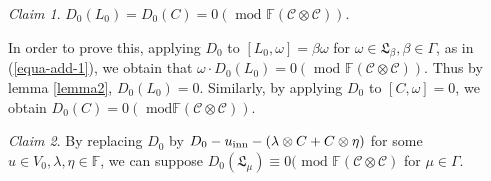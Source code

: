 \documentclass{amsart}
\theoremstyle{definition}
\theoremstyle{remark}
\numberwithin{equation}{subsection}
\numberwithin{equation}{section}
\newtheorem{clai}{Claim}
\begin{document}
\begin{clai}
\label{clai3} \rm $D_0(L_0)=D_0(C)=0(\mbox{ mod }\mathbb{F}(\mathcal
{C}\otimes \mathcal {C}))$.
\end{clai}

In order to prove this, applying $D_0$ to $[L_0,\omega]={\beta} \omega$
for $\omega \in {\mathfrak{L}}_\beta, {\beta} \in \Gamma$, as in
(\ref{equa-add-1}), we obtain that \mbox{$\omega\cdot
D_0(L_0)=0(\mbox{ mod }\mathbb{F}(\mathcal {C}\otimes \mathcal
{C}))$.} Thus by lemma \ref{lemma2}, $D_0(L_0)=0$. Similarly, by
applying $D_0$ to $[C,\omega]=0$, we obtain $D_0(C)=0 (\mbox{ mod
}\mathbb{F}(\mathcal {C}\otimes \mathcal {C}))$. \vskip4pt

\begin{clai}
\label{clai3} \rm By replacing $D_0$ by $D_0-u_{\rm
inn}-(\lambda\otimes C+C \otimes \eta)$ for some $u\in
V_0,\lambda,\eta\in \mathbb{F}$, we can suppose
$D_0(\mathfrak{L}_{\mu})\equiv0(\mbox{ mod }\mathbb{F}(\mathcal
{C}\otimes \mathcal {C})$ for $\mu \in\Gamma$.
\end{clai}
\end{document}
